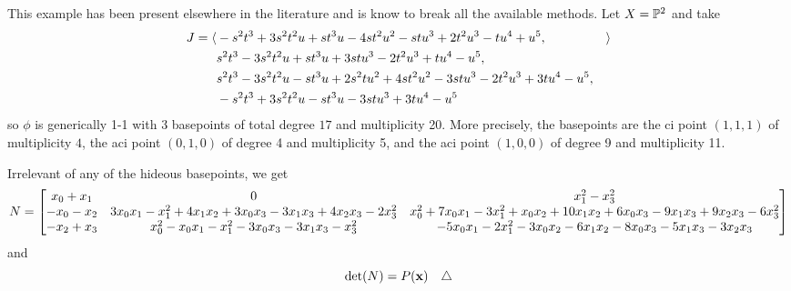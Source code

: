 \documentclass[fleqn,reqno]{amsart}
\numberwithin{first}{chapter}
\begin{document}
\begin{example}[$\mt{ex310}$]
\label{ex310}
This example has been present elsewhere in the literature and is know to break all the available methods.
Let $X=\mathbb{P}^2$ and take
\begin{align*}
	J=\langle &-s^{2} t^{3}+3 s^{2} t^{2} u+s t^{3} u-4 s t^{2} u^{2}-s t
	      u^{3}+2 t^{2} u^{3}-t u^{4}+u^{5}, &\rangle\\
		  &s^{2} t^{3}-3 s^{2} t^{2} u+s t^{3} u+3 s t
	      u^{3}-2 t^{2} u^{3}+t u^{4}-u^{5},\\
		  &s^{2} t^{3}-3 s^{2} t^{2} u-s t^{3} u+2
	      s^{2} t u^{2}+4 s t^{2} u^{2}-3 s t u^{3}-2 t^{2} u^{3}+3 t u^{4}-u^{5},\\
		  &-s^{2}
	      t^{3}+3 s^{2} t^{2} u-s t^{3} u-3 s t u^{3}+3 t u^{4}-u^{5}
\end{align*}
so $\phi$ is generically 1-1 with 3 basepoints of total degree $17$
and multiplicity 20. More precisely, the basepoints are the ci point $(1,1,1)$ of multiplicity $4$,
the aci point $(0,1,0)$ of degree 4 and multiplicity 5, and
the aci point $(1,0,0)$ of degree 9 and multiplicity 11.

Irrelevant of any of the hideous basepoints, we get
\[
	N=\bgroup\begin{bmatrix}{x}_{0}+{x}_{1}&
      0&
      {x}_{1}^{2}-{x}_{3}^{2}\\
      -{x}_{0}-{x}_{2}&
      3 {x}_{0} {x}_{1}-{x}_{1}^{2}+4 {x}_{1} {x}_{2}+3 {x}_{0} {x}_{3}-3 {x}_{1} {x}_{3}+4 {x}_{2} {x}_{3}-2 {x}_{3}^{2}&
      {x}_{0}^{2}+7 {x}_{0} {x}_{1}-3 {x}_{1}^{2}+{x}_{0} {x}_{2}+10 {x}_{1} {x}_{2}+6 {x}_{0} {x}_{3}-9 {x}_{1} {x}_{3}+9 {x}_{2} {x}_{3}-6 {x}_{3}^{2}\\
      -{x}_{2}+{x}_{3}&
      {x}_{0}^{2}-{x}_{0} {x}_{1}-{x}_{1}^{2}-3 {x}_{0} {x}_{3}-3 {x}_{1} {x}_{3}-{x}_{3}^{2}&
      -5 {x}_{0} {x}_{1}-2 {x}_{1}^{2}-3 {x}_{0} {x}_{2}-6 {x}_{1} {x}_{2}-8 {x}_{0} {x}_{3}-5 {x}_{1} {x}_{3}-3 {x}_{2} {x}_{3}\\
      \end{bmatrix}\egroup
\]
and
\[
	\det(N)=P(\mathbf x) \demo
\]
\end{example}
\end{document}
